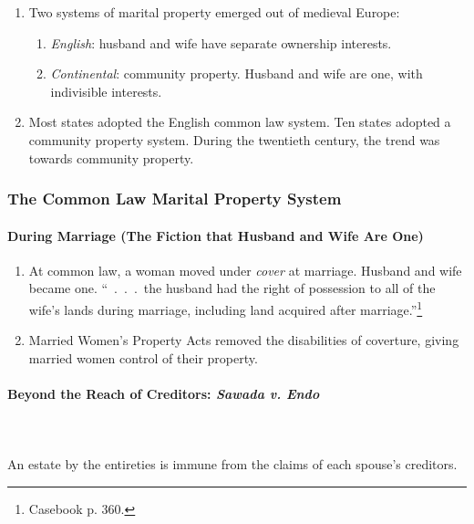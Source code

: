 \begin{enumerate}
    \item Two systems of marital property emerged out of medieval Europe:
    \begin{enumerate}
        \item \emph{English}: husband and wife have separate ownership 
        interests.
        \item \emph{Continental}: community property. Husband and wife are 
        one, with indivisible interests.
    \end{enumerate}
    \item Most states adopted the English common law system. Ten states 
    adopted a community property system. During the twentieth century, the 
    trend was towards community property.
\end{enumerate}

\subsubsection{The Common Law Marital Property System}

\paragraph{During Marriage (The Fiction that Husband and Wife Are One)}

\begin{enumerate}
    \item At common law, a woman moved under \emph{cover} at marriage. Husband 
    and wife became one. ``~.~.~.~the husband had the right of possession to 
    all of the wife's lands during marriage, including land acquired after 
    marriage.''\footnote{Casebook p. 360.}
    \item Married Women's Property Acts removed the disabilities of coverture, 
    giving married women control of their property.
\end{enumerate}

\paragraph{Beyond the Reach of Creditors: \emph{Sawada v. Endo}}
~\\\\
An estate by the entireties is immune from the claims of each spouse's 
creditors.


